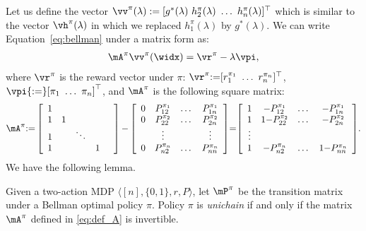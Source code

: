 Let us define the vector $\vv^\pi(\lambda):=[ g^*(\lambda)\ h^\pi_2(\lambda)\ \dots\ h^\pi_n(\lambda)]^\top$ which is similar to the vector $\vh^\pi(\lambda)$ in which we replaced $h^\pi_1(\lambda)$ by $g^*(\lambda)$. We can write Equation~\eqref{eq:bellman} under a matrix form as:
\begin{align}
    \mA^{\pi} \vv^\pi(\widx)
    = \vr^{\pi} - \lambda \vpi, \label{eq:pre_lin_eq}
\end{align}
where $\vr^{\pi}$ is the reward vector under $\pi$: $\vr^{\pi}{:=}[r^{\pi_1}_1\ \dots\ r^{\pi_n}_n]^\top$, $\vpi{:=}[\pi_1\ \dots\ \pi_n]^\top$, and $\mA^{\pi}$ is the following square matrix:
\begin{align}
    {\mA^{\pi} {:=} \left[\begin{array}{cccccc}
        1 & & & &\\
        1 & 1 &  &\\
        1 & & \ddots & \\
        1 & &  &1\\
    \end{array}
\right] {-}
        \left[\begin{array}{ccccc}
                0 & P_{12}^{\pi_1} &\dots & P^{\pi_1}_{1n}\\
                0 & P_{22}^{\pi_2} &\dots & P^{\pi_2}_{2n}\\
                  &\vdots&&\vdots\\
                0 & P_{n2}^{\pi_n} &\dots & P^{\pi_n}_{nn}\\
        \end{array}
        \right]}
        {=} {\left[\begin{array}{ccccc}
                1 & - P_{12}^{\pi_1} & \dots & -P_{1n}^{\pi_1}\\
                1 & 1{-}P_{22}^{\pi_2} & \dots & -P_{2n}^{\pi_2}\\
                \vdots\\
                1 &  -P_{n2}^{\pi_n} & \dots &1{-}P_{nn}^{\pi_n}
        \end{array}\right]}. \label{eq:def_A}
\end{align}
We have the following lemma.
\begin{lem}
\label{lem:invertible}
Given a two-action MDP $\langle [n], \{0,1\}, r, P\rangle$, let $\mP^\pi$ be the transition matrix under a Bellman optimal policy $\pi$.
Policy $\pi$ is \emph{unichain} if and only if the matrix $\mA^{\pi}$ defined in \eqref{eq:def_A} is invertible.
\end{lem}
